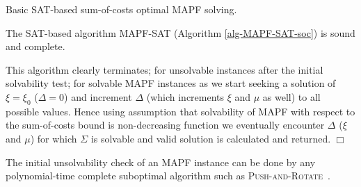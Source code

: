 \documentclass[jair,oneside,11pt]{article}
\begin{document}
\begin{algorithm}[t!]
\begin{footnotesize}
  \caption{Basic SAT-based sum-of-costs optimal MAPF solving.}
\label{alg-MAPF-SAT-soc}
\end{footnotesize}
\end{algorithm}

\begin{proposition}
The SAT-based algorithm MAPF-SAT (Algorithm \ref{alg-MAPF-SAT-soc}) is sound and complete. \label{prop:algorithm}
\end{proposition}

 This algorithm clearly terminates; for unsolvable instances after the initial solvability test; for solvable MAPF instances as we start
seeking a solution of $\xi=\xi_0$ ($\Delta=0$) and increment $\Delta$ (which increments $\xi$ and $\mu$ as well) to all possible values. Hence using assumption that solvability of MAPF with respect to the sum-of-costs bound is non-decreasing function we eventually encounter $\Delta$ ($\xi$ and $\mu$) for which $\Sigma$ is solvable and valid solution is calculated and returned. $\Box$
\vspace{0.25cm}

The initial unsolvability check of an MAPF instance can be done by any polynomial-time complete suboptimal algorithm such as \textsc{Push-and-Rotate}~\cite{DBLP:journals/jair/WildeMW14}.
\end{document}
